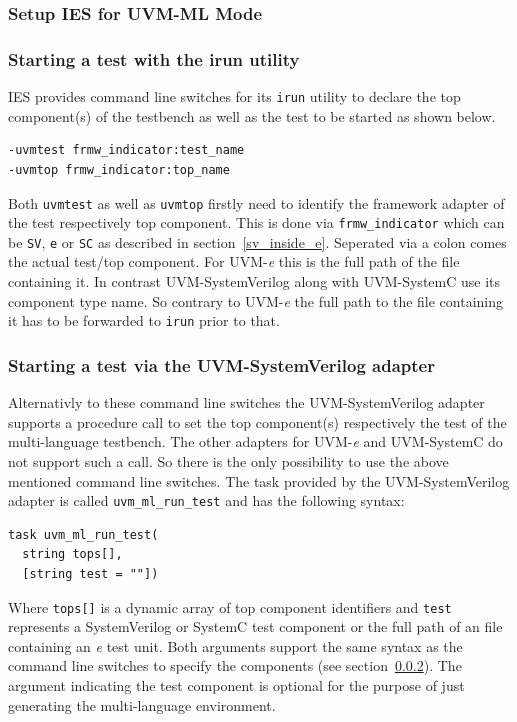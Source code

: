 \subsubsection{Setup IES for UVM-ML Mode}
\subsubsection{Starting a test with the irun utility} \label{uvm_top}

IES provides command line switches for its \lstinline$irun$ utility to declare the top component(s) of the testbench as
well as the test to be started as shown below.
\medskip
{}
\begin{lstlisting}
-uvmtest frmw_indicator:test_name
-uvmtop frmw_indicator:top_name
\end{lstlisting} 
\medskip
Both \lstinline$uvmtest$ as well as \lstinline$uvmtop$ firstly need to identify the framework adapter of the test
respectively top component. This is done via \lstinline$frmw_indicator$ which can be \lstinline$SV$, \lstinline$e$ or
\lstinline$SC$ as described in section~\ref{sv_inside_e}. Seperated via a colon comes the actual test/top component. For
UVM-\textit{e} this is the full path of the file containing it. In contrast UVM-SystemVerilog along with UVM-SystemC use
its component type name. So contrary to UVM-\textit{e} the full path to the file containing it has to be forwarded to
\lstinline$irun$ prior to that.

\subsubsection{Starting a test via the UVM-SystemVerilog adapter}

Alternativly to these command line switches the UVM-SystemVerilog adapter supports a procedure call to set the top
component(s) respectively the test of the multi-language testbench. The other adapters for UVM-\textit{e} and
UVM-SystemC do not support such a call. So there is the only possibility to use the above mentioned command line
switches. The task provided by the UVM-SystemVerilog adapter is called \lstinline$uvm_ml_run_test$ and has the following
syntax:
\medskip
{}
\begin{lstlisting}
task uvm_ml_run_test(
  string tops[],
  [string test = ""])
\end{lstlisting} 
\medskip
Where \lstinline$tops[]$ is a dynamic array of top component identifiers and \lstinline$test$ represents a
SystemVerilog or SystemC test component or the full path of an file containing an \textit{e} test unit. Both arguments
support the same syntax as the command line switches to specify the components (see section~\ref{uvm_top}). The argument
indicating the test component is optional for the purpose of just generating the multi-language environment.
